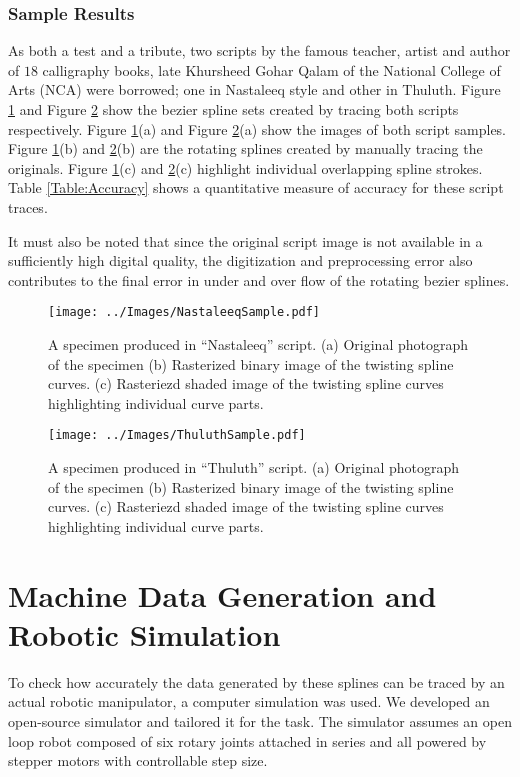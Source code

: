 \subsubsection{Sample Results}
As both a test and a tribute, two scripts by the famous teacher, artist and author of $18$ calligraphy books, late Khursheed Gohar Qalam \cite{bib23} of the National College of Arts (NCA) were borrowed; one in Nastaleeq style and other in Thuluth. Figure \ref{Fig:Nastaleeq} and Figure \ref{Fig:Thuluth} show the bezier spline sets created by tracing both scripts respectively. Figure \ref{Fig:Nastaleeq}(a) and Figure \ref{Fig:Thuluth}(a) show the images of both script samples. Figure \ref{Fig:Nastaleeq}(b) and \ref{Fig:Thuluth}(b) are the rotating splines created by manually tracing the originals. Figure \ref{Fig:Nastaleeq}(c) and \ref{Fig:Thuluth}(c) highlight individual overlapping spline strokes. Table \ref{Table:Accuracy} shows a quantitative measure of accuracy for these script traces.

It must also be noted that since the original script image is not available in a sufficiently high digital quality, the digitization and preprocessing error also contributes to the final error in under and over flow of the rotating bezier splines.

    \begin{figure}[!t]
    \centering
    \texttt{[image: ../Images/NastaleeqSample.pdf]}
      \caption{
        A specimen produced in ``Nastaleeq'' script. (a) Original photograph of the specimen (b) Rasterized binary image of the twisting spline curves. (c) Rasteriezd shaded image of the twisting spline curves highlighting individual curve parts.}
      \label{Fig:Nastaleeq}
    \end{figure}


    \begin{figure}[!t]
    \centering
    \texttt{[image: ../Images/ThuluthSample.pdf]}
    \caption{
        A specimen produced in ``Thuluth'' script. (a) Original photograph of the specimen (b) Rasterized binary image of the twisting spline curves. (c) Rasteriezd shaded image of the twisting spline curves highlighting individual curve parts.
    }
  \label{Fig:Thuluth}
\end{figure}

\section{Machine Data Generation and Robotic Simulation}
\label{Chapter:Simulation}
    To check how accurately the data generated by these splines can be traced by an actual robotic manipulator, a computer simulation was used. We developed an open-source simulator and tailored it for the task. The simulator assumes an open loop robot composed of six rotary joints attached in series and all powered by stepper motors with controllable step size.

